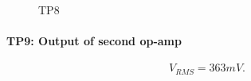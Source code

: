 \documentclass[12pt]{article}
\begin{document}
        \begin{figure}[H]
          \centering
          \qquad
          \caption{TP8}
          \label{fig:tp8_waveforms}
        \end{figure}
        \setcounter{subfigure}{0}

      \newpage
      \paragraph{TP9: Output of second op-amp}

        \begin{equation}
          V_{RMS} = 363mV.\nonumber
        \end{equation}
\end{document}
